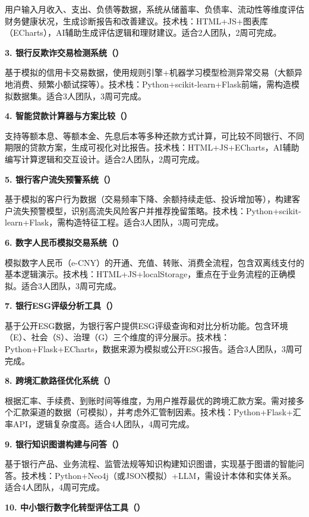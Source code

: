 用户输入月收入、支出、负债等数据，系统从储蓄率、负债率、流动性等维度评估财务健康状况，生成诊断报告和改善建议。技术栈：HTML+JS+图表库（ECharts），AI辅助生成评估逻辑和理财建议。适合2人团队，2周可完成。

\textbf{3. 银行反欺诈交易检测系统（）}

基于模拟的信用卡交易数据，使用规则引擎+机器学习模型检测异常交易（大额异地消费、频繁小额试探等）。技术栈：Python+scikit-learn+Flask前端，需构造模拟数据集。适合3人团队，3周可完成。

\textbf{4. 智能贷款计算器与方案比较（）}

支持等额本息、等额本金、先息后本等多种还款方式计算，可比较不同银行、不同期限的贷款方案，生成可视化对比报告。技术栈：HTML+JS+ECharts，AI辅助编写计算逻辑和交互设计。适合2人团队，2周可完成。

\textbf{5. 银行客户流失预警系统（）}

基于模拟的客户行为数据（交易频率下降、余额持续走低、投诉增加等），构建客户流失预警模型，识别高流失风险客户并推荐挽留策略。技术栈：Python+scikit-learn+Flask，需构造特征工程。适合3人团队，3周可完成。

\textbf{6. 数字人民币模拟交易系统（）}

模拟数字人民币（e-CNY）的开通、充值、转账、消费全流程，包含双离线支付的基本逻辑演示。技术栈：HTML+JS+localStorage，重点在于业务流程的正确模拟。适合3人团队，3周可完成。

\textbf{7. 银行ESG评级分析工具（）}

基于公开ESG数据，为银行客户提供ESG评级查询和对比分析功能。包含环境（E）、社会（S）、治理（G）三个维度的评分展示。技术栈：Python+Flask+ECharts，数据来源为模拟或公开ESG报告。适合3人团队，3周可完成。

\textbf{8. 跨境汇款路径优化系统（）}

根据汇率、手续费、到账时间等维度，为用户推荐最优的跨境汇款方案。需对接多个汇款渠道的数据（可模拟），并考虑外汇管制因素。技术栈：Python+Flask+汇率API，逻辑复杂度高。适合4人团队，4周可完成。

\textbf{9. 银行知识图谱构建与问答（）}

基于银行产品、业务流程、监管法规等知识构建知识图谱，实现基于图谱的智能问答。技术栈：Python+Neo4j（或JSON模拟）+LLM，需设计本体和实体关系。适合4人团队，4周可完成。

\textbf{10. 中小银行数字化转型评估工具（）}

